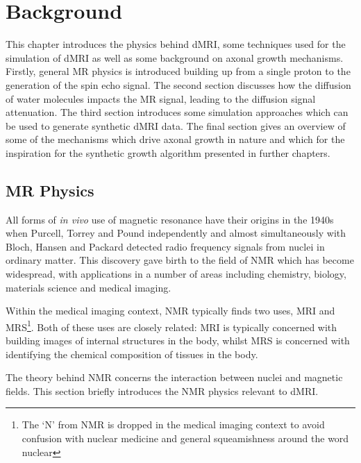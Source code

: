 \renewcommand{\BrainFuckChapter}{y}
\renewcommand{\LifeChapter}{y}
\chapter{Background}
\label{chap:background}
\chaptertoc{}

\begin{chapterabstract}
  This chapter introduces the physics behind \ac{dMRI}, some techniques used for the simulation of \ac{dMRI} as well as some background on axonal growth mechanisms.
  Firstly, general MR physics is introduced building up from a single proton to the generation of the spin echo signal.
  The second section discusses how the diffusion of water molecules impacts the MR signal, leading to the diffusion signal attenuation.
  The third section introduces some simulation approaches which can be used to generate synthetic \ac{dMRI} data.
  The final section gives an overview of some of the mechanisms which drive axonal growth in nature and which for the inspiration for the synthetic growth algorithm presented in further chapters. 
\end{chapterabstract}

\section{MR Physics}
\label{sec:bg_mri_physics}
All forms of \emph{in vivo} use of magnetic resonance have their origins in the 1940s when Purcell, Torrey and Pound independently and almost simultaneously with Bloch, Hansen and Packard detected radio frequency signals from nuclei in ordinary matter\cite{Levitt2008, Barker2009,Bloch1946,Purcell1946}.
This discovery gave birth to the field of \ac{NMR} which has become widespread, with applications in a number of areas including chemistry, biology, materials science and medical imaging\cite{Barker2009, Salibi1998}.

Within the medical imaging context, \ac{NMR} typically finds two uses, \acf{MRI} and \ac{MRS}\footnote{The `N' from NMR is dropped in the medical imaging context to avoid confusion with nuclear medicine and general squeamishness around the word nuclear}.
Both of these uses are closely related: \ac{MRI} is typically concerned with building images of internal structures in the body, whilst \ac{MRS} is concerned with identifying the chemical composition of tissues in the body.

The theory behind \ac{NMR} concerns the interaction between nuclei and magnetic fields. This section briefly introduces the \ac{NMR} physics relevant to \ac{dMRI}.

